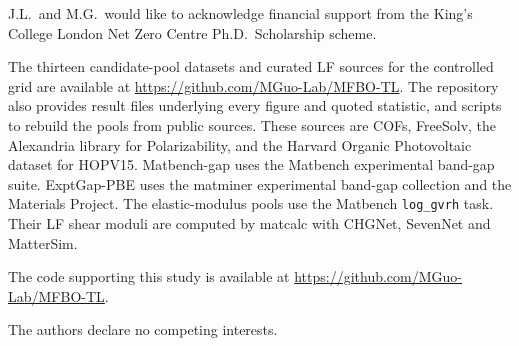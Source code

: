 \documentclass[pdflatex,sn-nature,iicol]{sn-jnl}%
\begin{document}

J.L.\ and M.G.\ would like to acknowledge financial support from the King's
College London Net Zero Centre Ph.D.\ Scholarship scheme.


The thirteen candidate-pool datasets and curated LF sources for the controlled grid are available at \url{https://github.com/MGuo-Lab/MFBO-TL}. The repository also provides result files underlying every figure and quoted statistic, and scripts to rebuild the pools from public sources. These sources are COFs\citep{gantzler2023multifidelity}, FreeSolv\citep{mobley2014freesolv}, the Alexandria library for Polarizability\citep{ghahremanpour2018alexandria}, and the Harvard Organic Photovoltaic dataset for HOPV15\citep{lopez2016harvard}. Matbench-gap uses the Matbench experimental band-gap suite\citep{dunn2020benchmarking}. ExptGap-PBE uses the matminer experimental band-gap collection\citep{zhuo2018predicting,ward2018matminer} and the Materials Project\citep{jain2013commentary}. The elastic-modulus pools use the Matbench \texttt{log\_gvrh} task\citep{dunn2020benchmarking}. Their LF shear moduli are computed by matcalc\citep{matcalc} with CHGNet\citep{deng2023chgnet}, SevenNet\citep{park2024scalable} and MatterSim\citep{yang2024mattersim}.


The code supporting this study is available at
\url{https://github.com/MGuo-Lab/MFBO-TL}.


The authors declare no competing interests.



\ifdefined\withSI
\onecolumn

\fi
\end{document}
